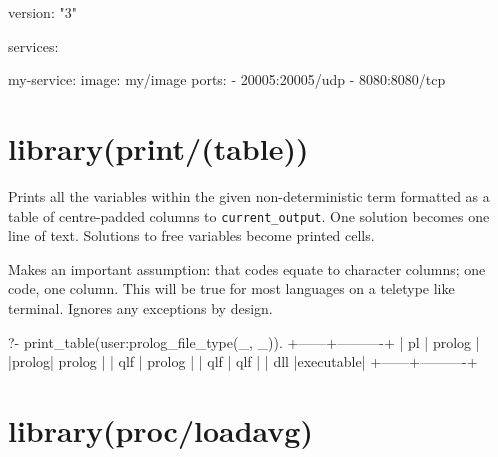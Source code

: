 \begin{code}
version: "3"

services:

  my-service:
    image: my/image
    ports:
      - 20005:20005/udp
      - 8080:8080/tcp
\end{code}

\vspace{0.7cm}\chapter{library(print/(table))}\label{sec:table}

\begin{description}
\nodescription
Prints all the variables within the given non-deterministic 
term formatted as a table of centre-padded columns to
\verb$current_output$. One  solution becomes one line of text.
Solutions to free variables become printed cells.

Makes an important assumption: that codes equate to character
columns; one code, one column. This will be true for most languages
on a teletype like terminal. Ignores any exceptions by design.

\begin{code}
?- print_table(user:prolog_file_type(_, _)).
+------+----------+
|  pl  |  prolog  |
|prolog|  prolog  |
| qlf  |  prolog  |
| qlf  |   qlf    |
| dll  |executable|
+------+----------+
\end{code}

\end{description}

\chapter{library(proc/loadavg)}\label{sec:loadavg}

